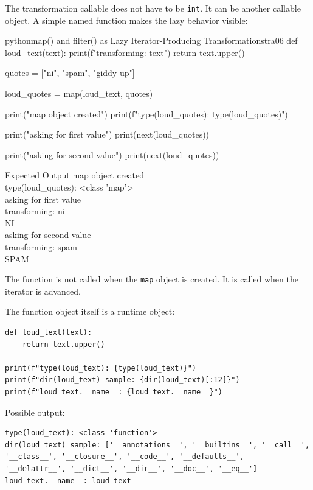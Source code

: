 \documentclass[a4paper,twoside]{report}
\begin{document}
The transformation callable does not have to be \texttt{int}. It can be another callable object. A simple named function makes the lazy behavior visible:

\begin{codebox}[]{python}{map() and filter() as Lazy Iterator-Producing Transformations}{tra06}
def loud_text(text):
    print(f"transforming: {text}")
    return text.upper()

quotes = ["ni", "spam", "giddy up"]

loud_quotes = map(loud_text, quotes)

print("map object created")
print(f"type(loud_quotes): {type(loud_quotes)}")

print("asking for first value")
print(next(loud_quotes))

print("asking for second value")
print(next(loud_quotes))
\end{codebox}


\begin{iobox}{Expected Output}
map object created \\
type(loud\_quotes): <class 'map'> \\
asking for first value \\
transforming: ni \\
NI \\
asking for second value \\
transforming: spam \\
SPAM \\
\end{iobox}




The function is not called when the \texttt{map} object is created. It is called when the iterator is advanced.

The function object itself is a runtime object:

\begin{verbatim}
def loud_text(text):
    return text.upper()

print(f"type(loud_text): {type(loud_text)}")
print(f"dir(loud_text) sample: {dir(loud_text)[:12]}")
print(f"loud_text.__name__: {loud_text.__name__}")
\end{verbatim}

Possible output:

\begin{verbatim}
type(loud_text): <class 'function'>
dir(loud_text) sample: ['__annotations__', '__builtins__', '__call__',
'__class__', '__closure__', '__code__', '__defaults__',
'__delattr__', '__dict__', '__dir__', '__doc__', '__eq__']
loud_text.__name__: loud_text
\end{verbatim}
\end{document}
